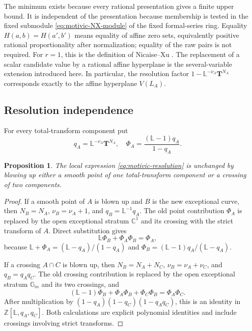 \documentclass[12pt]{amsart}
\numberwithin{equation}{section}
\theoremstyle{plain}
\newtheorem{proposition}[theorem]{Proposition}
\theoremstyle{definition}
\theoremstyle{remark}
\theoremstyle{definition}
\newcommand{\Z}{\mathbb Z}
\newcommand{\Lef}{\mathbb L}
\begin{document}
The minimum exists because every rational presentation gives a finite upper bound. It is independent of the presentation because membership is tested in the fixed submodule \eqref{eq:motivic-NX-module} of the fixed formal-series ring. Equality $H(a,b)=H(a',b')$ means equality of affine zero sets, equivalently positive rational proportionality after normalization; equality of the raw pairs is not required. For $r=1$, this is the definition of Nicaise--Xu \cite[Remark~3.7]{NicaiseXu2016}. The replacement of a scalar candidate value by a rational affine hyperplane is the several-variable extension introduced here. In particular, the resolution factor $1-\Lef^{-\nu_A}\mathbf T^{N_A}$ corresponds exactly to the affine hyperplane $V(L_A)$.

\subsection{Resolution independence}

For every total-transform component put
\begin{equation*}
q_A=\Lef^{-\nu_A}\mathbf T^{N_A},
 \quad \Phi_A=\frac{(\Lef-1)q_A}{1-q_A}.
\end{equation*}

\begin{proposition}\label{prop:motivic-blowup-identities}
The local expression \eqref{eq:motivic-resolution} is unchanged by blowing up either a smooth point of one total-transform component or a crossing of two components.
\end{proposition}

\begin{proof}
If a smooth point of $A$ is blown up and $B$ is the new exceptional curve, then $N_B=N_A$, $\nu_B=\nu_A+1$, and $q_B=\Lef^{-1}q_A$. The old point contribution $\Phi_A$ is replaced by the open exceptional stratum $\mathbb C^1$ and its crossing with the strict transform of $A$. Direct substitution gives
\begin{equation}\label{eq:motivic-smooth-blowup}
 \Lef\Phi_B+\Phi_A\Phi_B=\Phi_A,
\end{equation}
because $\Lef+\Phi_A=(\Lef-q_A)/(1-q_A)$ and $\Phi_B=(\Lef-1)q_A/(\Lef-q_A)$.

If a crossing $A\cap C$ is blown up, then $N_B=N_A+N_C$, $\nu_B=\nu_A+\nu_C$, and $q_B=q_Aq_C$. The old crossing contribution is replaced by the open exceptional stratum $\mathbb G_m$ and its two crossings, and
\begin{equation}\label{eq:motivic-crossing-blowup}
 (\Lef-1)\Phi_B+\Phi_A\Phi_B+\Phi_C\Phi_B=\Phi_A\Phi_C.
\end{equation}
After multiplication by $(1-q_A)(1-q_C)(1-q_Aq_C)$, this is an identity in $\Z[\Lef,q_A,q_C]$. Both calculations are explicit polynomial identities and include crossings involving strict transforms.
\end{proof}
\end{document}
